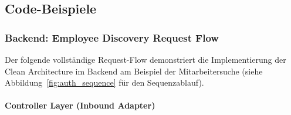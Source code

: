 \subsection{Code-Beispiele}

\subsubsection{Backend: Employee Discovery Request Flow}

Der folgende vollständige Request-Flow demonstriert die Implementierung der Clean Architecture im Backend am Beispiel der Mitarbeitersuche (siehe Abbildung~\ref{fig:auth_sequence} für den Sequenzablauf).

\paragraph{Controller Layer (Inbound Adapter)}\mbox{}\vspace{4pt}

